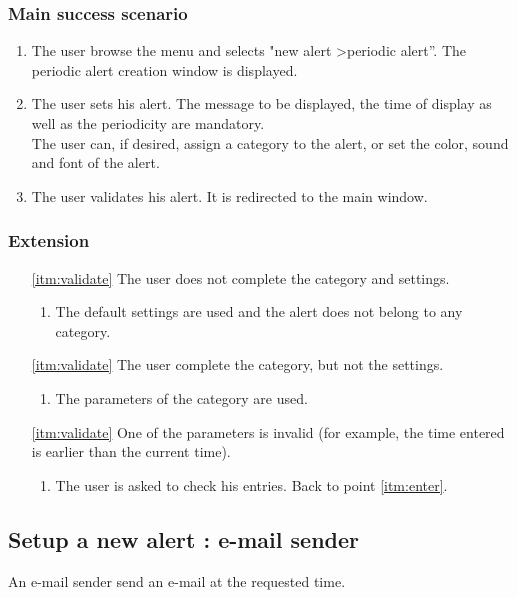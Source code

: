 \subsubsection{Main success scenario}
\begin{enumerate}
	\item The user browse the menu and selects "new alert \textgreater periodic alert''. The periodic alert creation window is displayed. 
	\item \label{itm:enter} The user sets his alert. The message to be displayed, the time of display as well as the periodicity are mandatory. \\The user can, if desired, assign a category to the alert, or set the color, sound and font of the alert.
	\item \label{itm:validate} The user validates his alert. It is redirected to the main window.
\end{enumerate}
\subsubsection{Extension}
\begin{enumerate}
	\item[\ref{itm:validate}] The user does not complete the category and settings.
	\begin{enumerate}[i]
		\item The default settings are used and the alert does not belong to any category.
	\end{enumerate}
	\item[\ref{itm:validate}] The user complete the category, but not the settings.
	\begin{enumerate}[i]
		\item The parameters of the category are used.
	\end{enumerate}
	\item[\ref{itm:validate}] One of the parameters is invalid (for example, the time entered is earlier than the current time).
	\begin{enumerate}[i]
		\item The user is asked to check his entries. Back to point \ref{itm:enter}.
	\end{enumerate}
\end{enumerate}

\subsection{Setup a new alert : e-mail sender}
An e-mail sender send an e-mail at the requested time.
